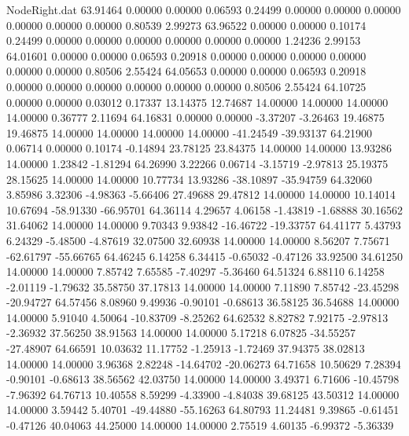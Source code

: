 \begin{filecontents}{NodeRight.dat}
  63.91464    0.00000    0.00000     0.06593    0.24499    0.00000    0.00000    0.00000    0.00000    0.00000    0.00000    0.80539    2.99273
  63.96522    0.00000    0.00000     0.10174    0.24499    0.00000    0.00000    0.00000    0.00000    0.00000    0.00000    1.24236    2.99153
  64.01601    0.00000    0.00000     0.06593    0.20918    0.00000    0.00000    0.00000    0.00000    0.00000    0.00000    0.80506    2.55424
  64.05653    0.00000    0.00000     0.06593    0.20918    0.00000    0.00000    0.00000    0.00000    0.00000    0.00000    0.80506    2.55424
  64.10725    0.00000    0.00000     0.03012    0.17337   13.14375   12.74687   14.00000   14.00000   14.00000   14.00000    0.36777    2.11694
  64.16831    0.00000    0.00000    -3.37207   -3.26463   19.46875   19.46875   14.00000   14.00000   14.00000   14.00000  -41.24549  -39.93137
  64.21900    0.06714    0.00000     0.10174   -0.14894   23.78125   23.84375   14.00000   14.00000   13.93286   14.00000    1.23842   -1.81294
  64.26990    3.22266    0.06714    -3.15719   -2.97813   25.19375   28.15625   14.00000   14.00000   10.77734   13.93286  -38.10897  -35.94759
  64.32060    3.85986    3.32306    -4.98363   -5.66406   27.49688   29.47812   14.00000   14.00000   10.14014   10.67694  -58.91330  -66.95701
  64.36114    4.29657    4.06158    -1.43819   -1.68888   30.16562   31.64062   14.00000   14.00000    9.70343    9.93842  -16.46722  -19.33757
  64.41177    5.43793    6.24329    -5.48500   -4.87619   32.07500   32.60938   14.00000   14.00000    8.56207    7.75671  -62.61797  -55.66765
  64.46245    6.14258    6.34415    -0.65032   -0.47126   33.92500   34.61250   14.00000   14.00000    7.85742    7.65585   -7.40297   -5.36460
  64.51324    6.88110    6.14258    -2.01119   -1.79632   35.58750   37.17813   14.00000   14.00000    7.11890    7.85742  -23.45298  -20.94727
  64.57456    8.08960    9.49936    -0.90101   -0.68613   36.58125   36.54688   14.00000   14.00000    5.91040    4.50064  -10.83709   -8.25262
  64.62532    8.82782    7.92175    -2.97813   -2.36932   37.56250   38.91563   14.00000   14.00000    5.17218    6.07825  -34.55257  -27.48907
  64.66591   10.03632   11.17752    -1.25913   -1.72469   37.94375   38.02813   14.00000   14.00000    3.96368    2.82248  -14.64702  -20.06273
  64.71658   10.50629    7.28394    -0.90101   -0.68613   38.56562   42.03750   14.00000   14.00000    3.49371    6.71606  -10.45798   -7.96392
  64.76713   10.40558    8.59299    -4.33900   -4.84038   39.68125   43.50312   14.00000   14.00000    3.59442    5.40701  -49.44880  -55.16263
  64.80793   11.24481    9.39865    -0.61451   -0.47126   40.04063   44.25000   14.00000   14.00000    2.75519    4.60135   -6.99372   -5.36339

\end{filecontents}
